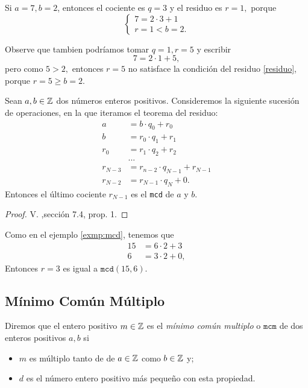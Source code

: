 	\begin{problema}
		Si $a=7,b=2$, entonces el cociente es $q=3$ y el residuo es $r=1,$ porque
		$$\begin{cases}
			7=2\cdot 3+1\\ {r=1}<{b=2}.     
		\end{cases}
		$$
	\end{problema}

		Observe que tambien podr\'iamos tomar $q=1, r=5$ y escribir $$7=2\cdot 1+5,$$ pero como ${5}>{2},$ entonces $r=5$ no 
		satisface la condici\'on del residuo \eqref{residuo}, porque ${r=5}\geq {b=2}.$

	\begin{alg}
		Sean $a,b\in \mathbb{Z}$ dos números enteros positivos. Consideremos la siguiente sucesi\'on de operaciones, en la que iteramos el teorema del residuo:
		\begin{align*}
			a&=b\cdot q_{0}+r_{0} \\
			b&=r_{0}\cdot q_{1}+r_{1}\\
			r_{0}&=r_{1}\cdot q_{2}+r_{2}\\
			&...\\
			r_{N-3}&=r_{n-2}\cdot q_{N-1}+r_{N-1}\\
			r_{N-2}&=r_{N-1}\cdot q_{N}+0.
		\end{align*}
		Entonces el último cociente $r_{N-1}$ es el \texttt{mcd} de $a$ y $b.$
	\end{alg}
	
	\begin{proof}
		V. \cite{cardenas1973algebra},sección 7.4, prop. 1.
	\end{proof}
	
	Como en el ejemplo \ref{exmp:mcd}, tenemos que 
	\begin{align*}
		15&=6\cdot 2+3\\ 
		6&=3\cdot 2+0, 
	\end{align*}
	Entonces $r=3$ es igual a $\texttt{mcd}(15,6)$.



\subsection{M\'inimo Común Múltiplo}


	\begin{defn}
		\label{mcm} 
		Diremos que el entero positivo $m\in \mathbb{Z}$ es el \emph{m\'inimo común multiplo} o $\texttt{mcm}$ de dos enteros positivos $a,b$ si
		\begin{itemize}
			\item $m$ es múltiplo tanto de de $a\in \mathbb{Z}$ como $b\in \mathbb{Z}$ y;
			\item $d$ es el número entero positivo más pequeño con esta propiedad.
		\end{itemize}		
	\end{defn}
	

